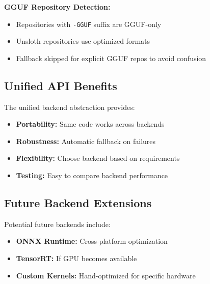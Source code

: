 \textbf{GGUF Repository Detection:}
\begin{itemize}
    \item Repositories with \texttt{-GGUF} suffix are GGUF-only
    \item Unsloth repositories use optimized formats
    \item Fallback skipped for explicit GGUF repos to avoid confusion
\end{itemize}

\subsection{Unified API Benefits}

The unified backend abstraction provides:

\begin{itemize}
    \item \textbf{Portability:} Same code works across backends
    \item \textbf{Robustness:} Automatic fallback on failures
    \item \textbf{Flexibility:} Choose backend based on requirements
    \item \textbf{Testing:} Easy to compare backend performance
\end{itemize}

\subsection{Future Backend Extensions}

Potential future backends include:

\begin{itemize}
    \item \textbf{ONNX Runtime:} Cross-platform optimization
    \item \textbf{TensorRT:} If GPU becomes available
    \item \textbf{Custom Kernels:} Hand-optimized for specific hardware
\end{itemize}
